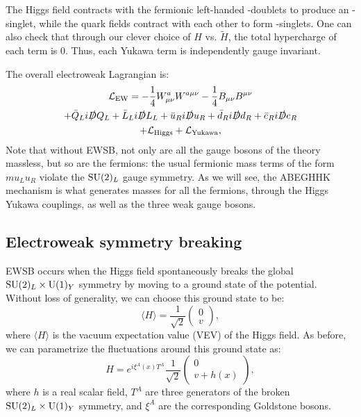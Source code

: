 The Higgs field contracts with the fermionic left-handed \SU[2]-doublets to produce an \SU[2]-singlet, while the quark fields contract with each other to form \SU[3]-singlets.
One can also check that through our clever choice of $H$ vs. $\tilde H$, the total hypercharge of each term is $0$.
Thus, each Yukawa term is independently gauge invariant.

The overall electroweak Lagrangian is:
\begin{multline}
	\label{eq:01_sm_ew_lagrangian}
	\mathcal{L}_{\mathrm{EW}} = -\frac{1}{4} W^a_{\mu\nu} W^{a\mu\nu} - \frac{1}{4} B_{\mu\nu} B^{\mu\nu} \\ 
	+ \bar{Q}_L i \slashed{D} Q_L + \bar{L}_L i \slashed{D} L_L + \bar{u}_R i \slashed{D} u_R + \bar{d}_R i \slashed{D} d_R + \bar{e}_R i \slashed{D} e_R \\
	+ \mathcal{L}_{\mathrm{Higgs}} + \mathcal{L}_{\mathrm{Yukawa}},
\end{multline}
Note that without EWSB, not only are all the gauge bosons of the theory massless, but so are the fermions:
the usual fermionic mass terms of the form $m u_L u_R$ violate the $\SU[2]_L$ gauge symmetry.
As we will see, the ABEGHHK mechanism is what generates masses for all the fermions, through the Higgs Yukawa couplings, as well as the three weak gauge bosons.

\subsection{Electroweak symmetry breaking}
\label{sec:01_sm_ew_ewsb}

EWSB occurs when the Higgs field spontaneously breaks the global $\SU[2]_L \times \UU[1]_Y$ symmetry by moving to a ground state of the potential.
Without loss of generality, we can choose this ground state to be:
\begin{equation}
	\label{eq:01_sm_ew_higgs_vev}
	\langle H \rangle = \frac{1}{\sqrt{2}} \begin{pmatrix} 0 \\ v \end{pmatrix},
\end{equation}
where $\langle H \rangle$ is the vacuum expectation value (VEV) of the Higgs field.
As before, we can parametrize the fluctuations around this ground state as:
\begin{equation}
	\label{eq:01_sm_ew_higgs_fluctuations}
	H = e^{i \xi^A(x)T^A}
	\frac{1}{\sqrt{2}} \begin{pmatrix} 0 \\ v + h(x) \end{pmatrix},
\end{equation}
where $h$ is a real scalar field, $T^A$ are three generators of the broken $\SU[2]_L \times \UU[1]_Y$ symmetry, and $\xi^A$ are the corresponding Goldstone bosons.


